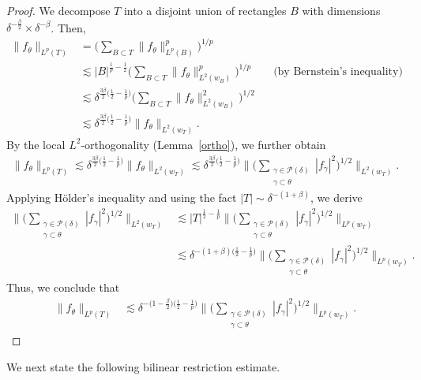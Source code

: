 \documentclass[reqno,centertags,11pt,a4paper]{amsart}
\begin{document}
\begin{proof}

We decompose ${T}$ into a disjoint union of rectangles $B$ with dimensions $\delta^{-\frac{\beta}{2}} \times \delta^{-\beta}$.
Then,
\begin{align*}
   \|f_\theta\|_{L^p({T})}
   &=\bigg(\sum_{B\subset {T}}\|f_\theta\|_{L^p(B)}^p\bigg)^{1/p}\\
   & \lesssim  |B|^{\frac{1}{p}-\frac{1}{2}}\bigg(\sum_{B\subset {T}}\|f_\theta\|_{L^2(w_B)}^p\bigg)^{1/p}
   \qquad\text{(by Bernstein's inequality)}\\
   &\lesssim\delta^{\frac{3\beta}{2}\bigl(\frac{1}{2}-\frac{1}{p}\bigr)}\bigg(\sum_{B\subset {T}}\|f_\theta\|_{L^2(w_B)}^2\bigg)^{1/2}\\
   &\lesssim\delta^{\frac{3\beta}{2}\bigl(\frac{1}{2}-\frac{1}{p}\bigr)}\|f_\theta\|_{L^2(w_{{T}})}.
\end{align*}
By the local $L^2$-orthogonality (Lemma~\ref{ortho}), we further obtain
\begin{align*}
\|f_\theta\|_{L^p(T)}
\lesssim\delta^{\frac{3\beta}{2}\bigl(\frac{1}{2}-\frac{1}{p}\bigr)}\|f_\theta\|_{L^2(w_{{T}})}
\lesssim\delta^{\frac{3\beta}{2}\bigl(\frac{1}{2}-\frac{1}{p}\bigr)}\bigg\|\bigg(\sum_{\substack{\gamma\in\mathcal{P}(\delta) \\ \gamma \subset \theta}}|f_\gamma|^2\bigg)^{1/2}\bigg\|_{L^2(w_{{T}})}.
\end{align*}
Applying H\"older's inequality and using the fact $|T|\sim \delta^{-(1+\beta)}$, we derive
\begin{align*}
\bigg\|\bigg(\sum_{\substack{\gamma\in\mathcal{P}(\delta) \\ \gamma \subset \theta}}|f_\gamma|^2\bigg)^{1/2}\bigg\|_{L^2(w_{{T}})}
&\lesssim|{T}|^{\frac{1}{2}-\frac{1}{p}}\bigg\|\bigg(\sum_{\substack{\gamma\in\mathcal{P}(\delta) \\ \gamma \subset \theta}}|f_\gamma|^2\bigg)^{1/2}\bigg\|_{L^p(w_{{T}})}\\
&\lesssim\delta^{-(1+\beta)\bigl(\frac{1}{2}-\frac{1}{p}\bigr)}\bigg\|\bigg(\sum_{\substack{\gamma\in\mathcal{P}(\delta) \\ \gamma \subset \theta}}|f_\gamma|^2\bigg)^{1/2}\bigg\|_{L^p(w_{T})}.
\end{align*}
Thus, we conclude that
\begin{align*}
  \|f_\theta\|_{L^p(T)}  &\lesssim\delta^{-\bigl(1-\frac{\beta}{2}\bigr)\bigl(\frac{1}{2}-\frac{1}{p}\bigr)}\bigg\|\bigg(\sum_{\substack{\gamma\in\mathcal{P}(\delta) \\ \gamma \subset \theta}}|f_\gamma|^2\bigg)^{1/2}\bigg\|_{L^p(w_{T})}.
\end{align*}
\end{proof}
We next state the following bilinear restriction estimate.
\end{document}
